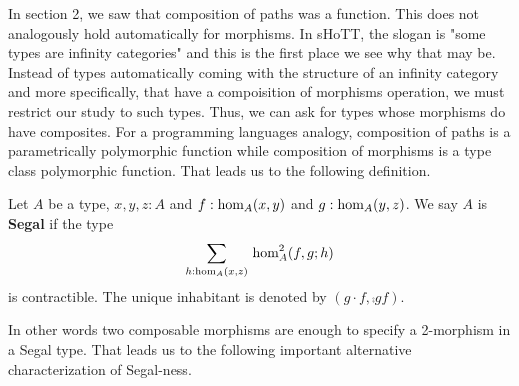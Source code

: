 \documentclass[main.tex]{subfiles}
\begin{document}
In section 2, we saw that composition of paths was a function. This does not analogously hold automatically for morphisms. In sHoTT,
the slogan is "some types are infinity categories" and this is the first place we see why that may be. Instead of types automatically
coming with the structure of an infinity category and more specifically, that have a compoisition of morphisms operation, we must
restrict our study to such types. Thus, we can ask for types whose morphisms do have composites. For a programming languages analogy, 
composition of paths is a parametrically polymorphic function while composition of morphisms is a type class polymorphic function.
That leads us to the following definition.
\begin{definition}\label{def:def3.3}
    Let $A$ be a type, $x,y,z : A$ and $f : \ho[A]{x}{y}$ and $g : \ho[A]{y}{z}$. We say $A$ is \textbf{Segal} if the type $${\sm{h : \ho[A]{x}{z}} \hot[A]{f}{g}{h}} $$
    is contractible. The unique inhabitant is denoted by $(g\cdot f, \comp{g}{f}).$
\end{definition}

In other words two composable morphisms are enough to specify a 2-morphism in a Segal type. That leads us to the following important alternative characterization of Segal-ness.
\end{document}
